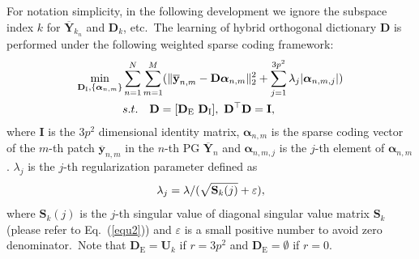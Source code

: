 \documentclass[10pt,twocolumn,letterpaper]{article}
\begin{document}
For notation simplicity, in the following development we ignore the subspace index $k$ for $\mathbf{\overline{Y}}_{k_{n}}$ and $\mathbf{D}_{k}$, etc.\ The learning of hybrid orthogonal dictionary $\mathbf{D}$ is performed under the following weighted sparse coding
framework:
\vspace{-2mm}
\begin{equation}\label{equ4}\vspace{-2mm}
\begin{split}
\min_{\mathbf{D}_{\text{I}},\{\bm{\alpha}_{n,m}\}}
&\sum_{n=1}^{N}\sum_{m=1}^{M}(\|\mathbf{\overline{y}}_{n,m}-\mathbf{D}\bm{\alpha}_{n,m}\|_{2}^{2}+\sum_{j=1}^{3p^{2}}\lambda_{j}|\bm{\alpha}_{n,m,j}|)
\\
&
s.t.
\quad
\mathbf{D}=[\mathbf{D}_{\text{E}}\ \mathbf{D}_{\text{I}}],\ \mathbf{D}^{\top}\mathbf{D} = \mathbf{I},
\end{split}
\end{equation}
where $\mathbf{I}$ is the $3p^{2}$ dimensional identity matrix, $\bm{\alpha}_{n,m}$ is the sparse coding vector of the $m$-th patch $\mathbf{\overline{y}}_{n,m}$ in the $n$-th PG $\mathbf{\overline{Y}}_{n}$ and $\bm{\alpha}_{n,m,j}$ is the $j$-th element of $\bm{\alpha}_{n,m}$. $\lambda_{j}$ is the $j$-th regularization parameter defined as
\vspace{-2mm}
\begin{equation}\label{equ5}\vspace{-2mm}
\lambda_{j} = \lambda/(\sqrt{\mathbf{S}_{k}(j)}+\varepsilon),
\end{equation}
where $\mathbf{S}_{k}(j)$ is the $j$-th singular value of diagonal singular value matrix $\mathbf{S}_{k}$ (please refer to Eq.\ (\ref{equ2})) and $\varepsilon$ is a small positive number to avoid zero denominator.\ Note that $\mathbf{D}_{\text{E}}=\mathbf{U}_{k}$ if $r=3p^{2}$ and $\mathbf{D}_{\text{E}}=\emptyset$ if $r=0$.

\end{document}
